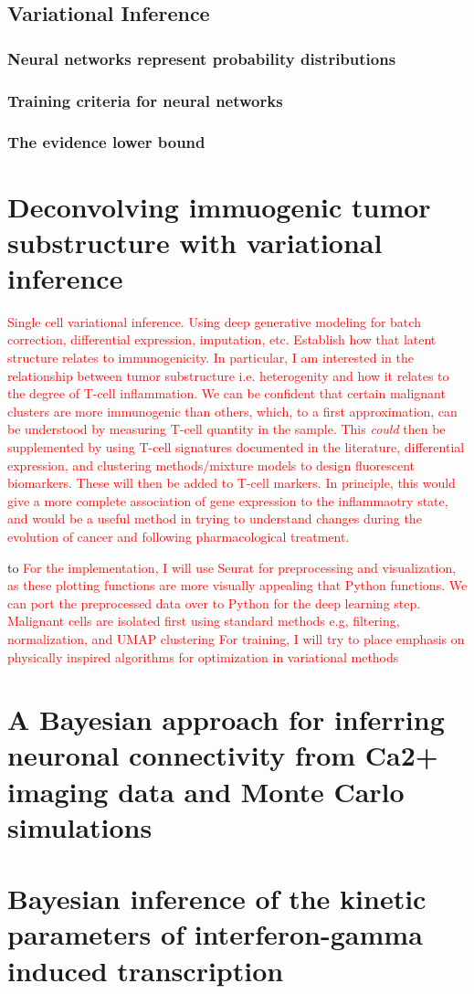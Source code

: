 \documentclass{ucetd}
\begin{document}
\section{Variational Inference}


\subsection{Neural networks represent probability distributions}

\subsection{Training criteria for neural networks}

\subsection{The evidence lower bound}

\chapter{Deconvolving immuogenic tumor substructure with variational inference}

\textcolor{red}{Single cell variational inference. Using deep generative modeling for batch correction, differential expression, imputation, etc. Establish how that latent structure relates to immunogenicity. In particular, I am interested in the relationship between tumor substructure i.e. heterogenity and how it relates to the degree of T-cell inflammation. We can be confident that certain malignant clusters are more immunogenic than others, which, to a first approximation, can be understood by measuring T-cell quantity in the sample. This \emph{could} then be supplemented by using T-cell signatures documented in the literature, differential expression, and clustering methods/mixture models to design fluorescent biomarkers. These will then be added to T-cell markers. In principle, this would give a more complete association of gene expression to the inflammaotry state, and would be a useful method in trying to understand changes during the evolution of cancer and following pharmacological treatment.}

\vspace{0.2in}
to 
\textcolor{red}{For the implementation, I will use Seurat for preprocessing and visualization, as these plotting functions are more visually appealing that Python functions. We can port the preprocessed data over to Python for the deep learning step. Malignant cells are isolated first using standard methods e.g, filtering, normalization, and UMAP clustering For training, I will try to place emphasis on physically inspired algorithms for optimization in variational methods}

\chapter{A Bayesian approach for inferring neuronal connectivity from Ca2+ imaging data and Monte Carlo simulations}

\chapter{Bayesian inference of the kinetic parameters of interferon-gamma induced transcription}


\makebibliography
\end{document}
